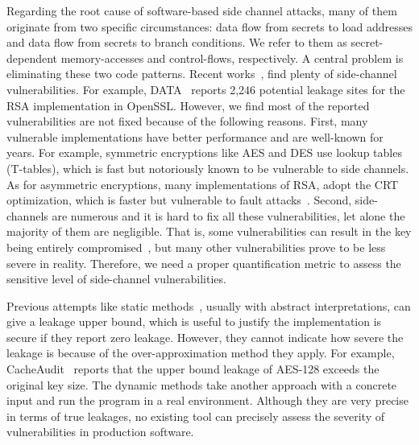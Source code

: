 Regarding the root cause of software-based side channel attacks, many of them originate
from two specific circumstances: data flow from secrets to load
addresses and data flow from secrets to branch conditions. We refer to them as
 secret-dependent memory-accesses and control-flows, respectively. A
central problem is eliminating these two code patterns. 
Recent
works~\cite{203878,217537,Wichelmann:2018:MFF:3274694.3274741,Brotzman19Casym,236338,182946},
find plenty of side-channel vulnerabilities. For example,
DATA~\cite{217537} reports 2,246 potential leakage sites for the RSA
implementation in OpenSSL\@. 
However, we find most of the reported vulnerabilities are not fixed because
of the following reasons.
First, many vulnerable implementations have better performance and 
are well-known for years. For example,
symmetric encryptions like AES and DES use lookup tables (T-tables), which
is fast but notoriously known to be vulnerable to side channels.
As for asymmetric encryptions, many implementations of RSA, adopt the CRT optimization,
which is faster but vulnerable to fault attacks~\cite{aumuller2002fault}.
Second, side-channels are numerous and it is hard to fix all these vulnerabilities,
let alone the majority of them are negligible. 
That is, some vulnerabilities can result in the key being 
entirely compromised~\cite{184415, aumuller2002fault}, but many other vulnerabilities prove to be less
severe in reality. Therefore, we need a proper quantification metric to 
assess the sensitive level of side-channel vulnerabilities.

Previous attempts like static methods~\cite{182946,5207642}, usually with
abstract interpretations, can give a leakage upper bound, which is useful to
justify the implementation is secure if they report zero leakage.
However, they cannot indicate how severe the leakage is because of the
over-approximation method they apply. For example, CacheAudit~\cite{182946} 
reports that the upper
bound leakage of AES-128 exceeds the original key size. The dynamic methods take
another approach with a concrete input and run the program in a real
environment. Although they are very precise in terms of true leakages, no
existing tool can precisely assess the severity of vulnerabilities in production
software. 

